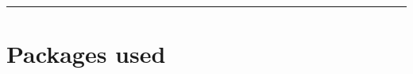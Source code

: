 \documentclass[11pt,a4paper,]{article}
\begin{document}
\begin{center}\rule{0.5\linewidth}{0.5pt}\end{center}

\hypertarget{packages-used}{%
\section{Packages used}\label{packages-used}}

\cite{1}
\cite{2}
\cite{3}
\cite{4}
\cite{9}

\printbibliography
\end{document}
